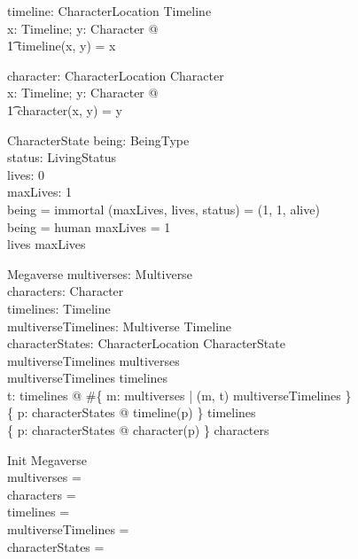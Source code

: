 \documentclass{article}
\begin{document}
\begin{axdef}
timeline: CharacterLocation \fun Timeline \\
\where
\forall x: Timeline; y: Character @ \\
\t1 timeline(x, y) = x \\
\end{axdef}

\begin{axdef}
character: CharacterLocation \fun Character \\
\where
\forall x: Timeline; y: Character @ \\
\t1 character(x, y) = y \\
\end{axdef} 

\begin{schema}{CharacterState}
being: BeingType \\
status: LivingStatus \\
lives: 0   \\ 
maxLives: 1  \\ 
\where
being = immortal \implies (maxLives, lives, status) = (1, 1, alive) \\
being = human \implies maxLives = 1 \\
lives \leq maxLives \\ 
\end{schema}

\begin{schema}{Megaverse}
multiverses: \power Multiverse \\
characters: \power Character \\
timelines: \power Timeline \\ 
multiverseTimelines: Multiverse \rel Timeline \\
characterStates: CharacterLocation \pfun CharacterState \\
\where
\dom multiverseTimelines \subseteq multiverses \\ 
\ran multiverseTimelines \subseteq timelines \\ 
\forall t: timelines @ \#\{ m: multiverses | (m, t) \in multiverseTimelines \}  \\
\{ p: \dom characterStates @ timeline(p) \} \subseteq timelines \\
\{ p: \dom characterStates @ character(p) \} \subseteq characters \\
\end{schema}

\begin{schema}{Init}
Megaverse \\ 
\where
multiverses = \emptyset \\
characters = \emptyset \\ 
timelines = \emptyset \\
multiverseTimelines = \emptyset \\
characterStates = \emptyset \\
\end{schema}
\end{document}
